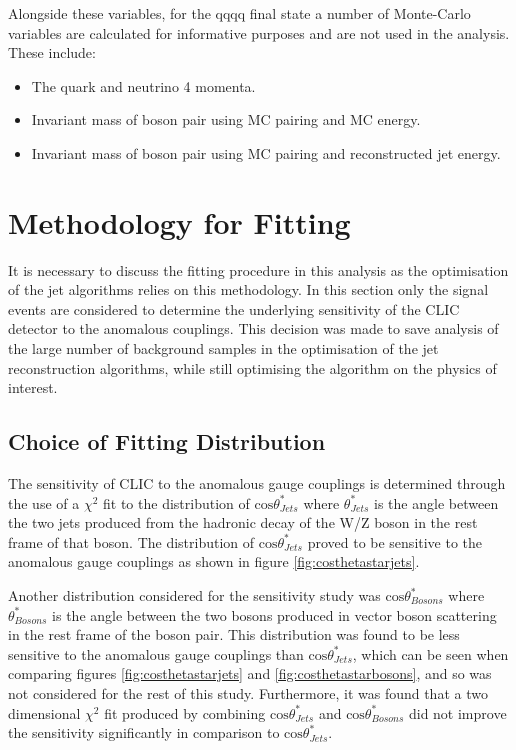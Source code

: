 Alongside these variables, for the \nu{\nu}qqqq final state a number of Monte-Carlo variables are calculated for informative purposes and are not used in the analysis. These include:
\begin{itemize}
\item The quark and neutrino 4 momenta.
\item Invariant mass of boson pair using MC pairing and MC energy.
\item Invariant mass of boson pair using MC pairing and reconstructed jet energy.
\end{itemize}

\section{Methodology for Fitting}
It is necessary to discuss the fitting procedure in this analysis as the optimisation of the jet algorithms relies on this methodology. In this section only the signal events are considered to determine the underlying sensitivity of the CLIC detector to the anomalous couplings. This decision was made to save analysis of the large number of background samples in the optimisation of the jet reconstruction algorithms, while still optimising the algorithm on the physics of interest.

\subsection{Choice of Fitting Distribution}
The sensitivity of CLIC to the anomalous gauge couplings is determined through the use of a $\chi^{2}$ fit to the distribution of $\text{cos}\theta^{*}_{Jets}$ where $\theta^{*}_{Jets}$ is the angle between the two jets produced from the hadronic decay of the W/Z boson in the rest frame of that boson.  The distribution of $\text{cos}\theta^{*}_{Jets}$ proved to be sensitive to the anomalous gauge couplings as shown in figure \ref{fig:costhetastarjets}.

Another distribution considered for the sensitivity study was  $\text{cos}\theta^{*}_{Bosons}$ where $\theta^{*}_{Bosons}$ is the angle between the two bosons produced in vector boson scattering in the rest frame of the boson pair.  This distribution was found to be less sensitive to the anomalous gauge couplings than $\text{cos}\theta^{*}_{Jets}$, which can be seen when comparing figures \ref{fig:costhetastarjets} and \ref{fig:costhetastarbosons}, and so was not considered for the rest of this study.  Furthermore, it was found that a two dimensional $\chi^{2}$ fit produced by combining $\text{cos}\theta^{*}_{Jets}$ and $\text{cos}\theta^{*}_{Bosons}$ did not improve the sensitivity significantly in comparison to $\text{cos}\theta^{*}_{Jets}$.

